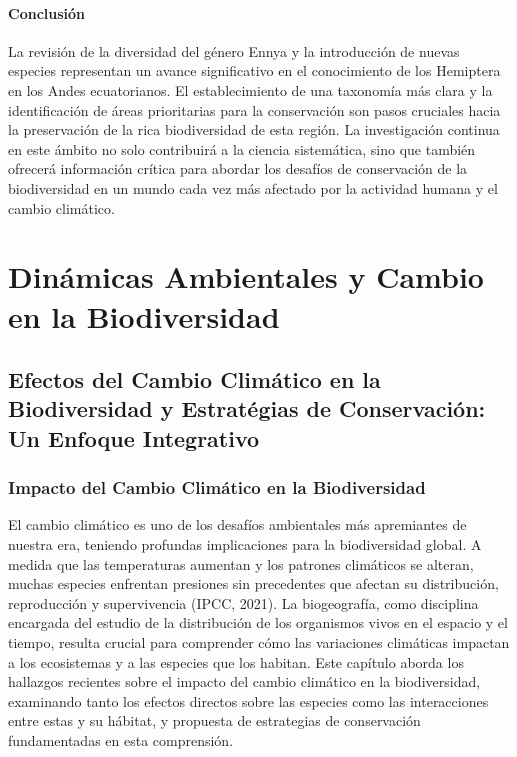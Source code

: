 \documentclass[
  letterpaper,
  DIV=11,
  numbers=noendperiod,
  oneside]{scrreprt}
\begin{document}
\subsection{Conclusión}\label{conclusiuxf3n}

La revisión de la diversidad del género Ennya y la introducción de
nuevas especies representan un avance significativo en el conocimiento
de los Hemiptera en los Andes ecuatorianos. El establecimiento de una
taxonomía más clara y la identificación de áreas prioritarias para la
conservación son pasos cruciales hacia la preservación de la rica
biodiversidad de esta región. La investigación continua en este ámbito
no solo contribuirá a la ciencia sistemática, sino que también ofrecerá
información crítica para abordar los desafíos de conservación de la
biodiversidad en un mundo cada vez más afectado por la actividad humana
y el cambio climático.

\part{Dinámicas Ambientales y Cambio en la Biodiversidad}

\chapter{Efectos del Cambio Climático en la Biodiversidad y Estratégias
de Conservación: Un Enfoque
Integrativo}\label{efectos-del-cambio-climuxe1tico-en-la-biodiversidad-y-estratuxe9gias-de-conservaciuxf3n-un-enfoque-integrativo}

\section{Impacto del Cambio Climático en la
Biodiversidad}\label{impacto-del-cambio-climuxe1tico-en-la-biodiversidad}

El cambio climático es uno de los desafíos ambientales más apremiantes
de nuestra era, teniendo profundas implicaciones para la biodiversidad
global. A medida que las temperaturas aumentan y los patrones climáticos
se alteran, muchas especies enfrentan presiones sin precedentes que
afectan su distribución, reproducción y supervivencia (IPCC, 2021). La
biogeografía, como disciplina encargada del estudio de la distribución
de los organismos vivos en el espacio y el tiempo, resulta crucial para
comprender cómo las variaciones climáticas impactan a los ecosistemas y
a las especies que los habitan. Este capítulo aborda los hallazgos
recientes sobre el impacto del cambio climático en la biodiversidad,
examinando tanto los efectos directos sobre las especies como las
interacciones entre estas y su hábitat, y propuesta de estrategias de
conservación fundamentadas en esta comprensión.
\end{document}
